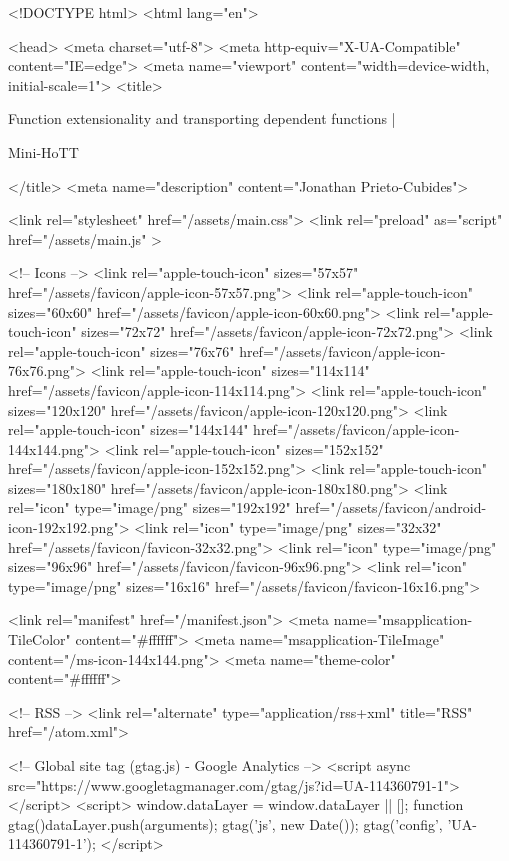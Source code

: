 <!DOCTYPE html>
<html lang="en">

<head>
  <meta charset="utf-8">
  <meta http-equiv="X-UA-Compatible" content="IE=edge">
  <meta name="viewport" content="width=device-width, initial-scale=1">
  <title>
    
      
        Function extensionality and transporting dependent functions  |
      
        Mini-HoTT
    
  </title>
  <meta name="description" content="Jonathan Prieto-Cubides">

  <link rel="stylesheet" href="/assets/main.css">
  <link rel="preload" as="script" href="/assets/main.js" >

  <!-- Icons -->
  <link rel="apple-touch-icon" sizes="57x57" href="/assets/favicon/apple-icon-57x57.png">
  <link rel="apple-touch-icon" sizes="60x60" href="/assets/favicon/apple-icon-60x60.png">
  <link rel="apple-touch-icon" sizes="72x72" href="/assets/favicon/apple-icon-72x72.png">
  <link rel="apple-touch-icon" sizes="76x76" href="/assets/favicon/apple-icon-76x76.png">
  <link rel="apple-touch-icon" sizes="114x114" href="/assets/favicon/apple-icon-114x114.png">
  <link rel="apple-touch-icon" sizes="120x120" href="/assets/favicon/apple-icon-120x120.png">
  <link rel="apple-touch-icon" sizes="144x144" href="/assets/favicon/apple-icon-144x144.png">
  <link rel="apple-touch-icon" sizes="152x152" href="/assets/favicon/apple-icon-152x152.png">
  <link rel="apple-touch-icon" sizes="180x180" href="/assets/favicon/apple-icon-180x180.png">
  <link rel="icon" type="image/png" sizes="192x192"  href="/assets/favicon/android-icon-192x192.png">
  <link rel="icon" type="image/png" sizes="32x32" href="/assets/favicon/favicon-32x32.png">
  <link rel="icon" type="image/png" sizes="96x96" href="/assets/favicon/favicon-96x96.png">
  <link rel="icon" type="image/png" sizes="16x16" href="/assets/favicon/favicon-16x16.png">

  <link rel="manifest" href="/manifest.json">
  <meta name="msapplication-TileColor" content="#ffffff">
  <meta name="msapplication-TileImage" content="/ms-icon-144x144.png">
  <meta name="theme-color" content="#ffffff">

  <!-- RSS -->
  <link rel="alternate" type="application/rss+xml" title="RSS" href="/atom.xml">

  <!-- Global site tag (gtag.js) - Google Analytics -->
  <script async src="https://www.googletagmanager.com/gtag/js?id=UA-114360791-1"></script>
  <script>
    window.dataLayer = window.dataLayer || [];
    function gtag(){dataLayer.push(arguments);}
    gtag('js', new Date());
    gtag('config', 'UA-114360791-1');
  </script>

